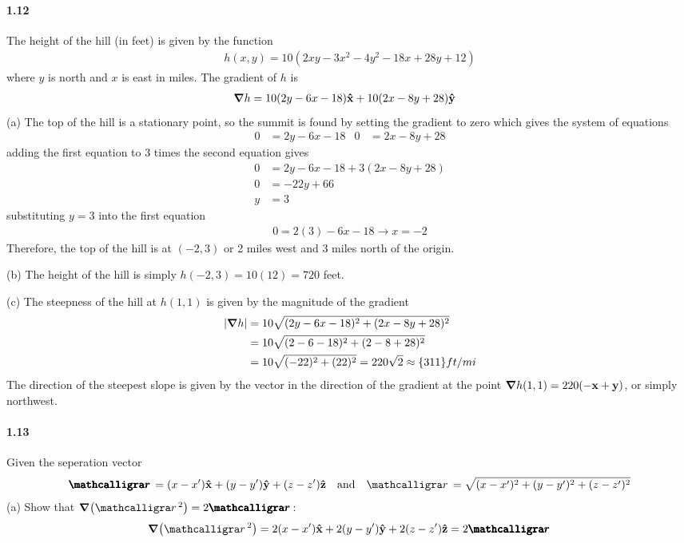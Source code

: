\documentclass[../main.tex]{subfiles}
\begin{document}
\paragraph{1.12}
The height of the hill (in feet) is given by the function
\begin{align*}
    h(x, y) = 10 (2xy - 3x^2 - 4y^2 - 18x + 28y + 12)
\end{align*}
where $y$ is north and $x$ is east in miles. The gradient of $h$ is
\begin{align*}
    \grad{h} &= 10 (2y - 6x - 18) \vu{x} + 10 (2x - 8y + 28) \vu{y}
\end{align*}
(a) The top of the hill is a stationary point, so the summit is found by setting the gradient to
zero which gives the system of equations
\begin{align*}
    0 &= 2y - 6x - 18 & 0 &= 2x - 8y + 28
\end{align*}
adding the first equation to 3 times the second equation gives
\begin{align*}
    0 &= 2y - 6x - 18 + 3(2x - 8y + 28) \\
    0 &= -22y + 66 \\
    y &= 3
\end{align*}
substituting $y = 3$ into the first equation
\begin{align*}
    0 = 2(3) - 6x - 18 \to x = -2
\end{align*}
Therefore, the top of the hill is at $(-2, 3)$ or 2 miles west and 3 miles north of the origin.

(b) The height of the hill is simply $h(-2, 3) = 10(12) = 720$ feet.

(c) The steepness of the hill at $h(1,1)$ is given by the magnitude of the gradient
\begin{align*}
    \abs{\grad{h}} &= 10\sqrt{(2y - 6x - 18)^2 + (2x - 8y + 28)^2} \\
    &= 10\sqrt{(2 - 6 - 18)^2 + (2 - 8 + 28)^2} \\
    &= 10\sqrt{(-22)^2 + (22)^2} = 220 \sqrt{2} \approx \qty{311}{ft/mi}
\end{align*}
The direction of the steepest slope is given by the vector in the direction of the gradient
at the point $\grad{h(1,1)} = 220(-\vb{x} + \vb{y})$, or simply northwest.

\paragraph{1.13}
Given the seperation vector
\begin{align*}
    \boldscriptr = (x - x') \vu{x} + (y - y') \vu{y} + (z - z') \vu{z} \qand 
    \scriptr = \sqrt{(x - x')^2 + (y - y')^2 + (z - z')^2}
\end{align*}
(a) Show that $\grad(\scriptr^2) = 2 \boldscriptr$:
\begin{align*}
    \grad(\scriptr^2) = 2(x - x') \vu{x} + 2(y - y') \vu{y} + 2(z - z') \vu{z} = 2 \boldscriptr
\end{align*}
\end{document}
